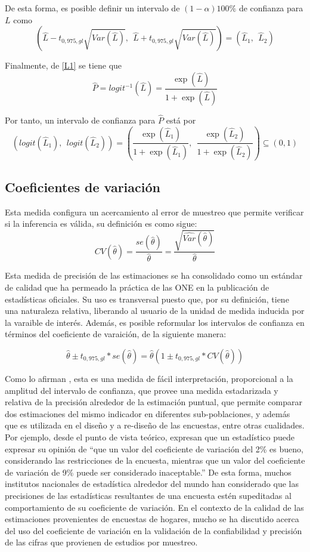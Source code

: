 \documentclass[12pt,spanish,]{book}
\begin{document}
De esta forma, es posible definir un intervalo de \((1-\alpha)100\%\) de confianza para \(L\) como
\[
\left(\hat{L} - t_{0,975, gl}\sqrt{Var(\hat{L})}, \ \
\hat{L} + t_{0,975, gl}\sqrt{Var(\hat{L})}
\right) =
(\hat{L}_1, \ \ \hat{L}_2)
\]

Finalmente, de \eqref{L1} se tiene que
\[
\hat{P} = logit^{-1}(\hat L) = \dfrac{\exp (\hat{L})}{1+\exp (\hat{L})}
\]

Por tanto, un intervalo de confianza para \(\hat{P}\) está por
\[
\left(logit(\hat{L}_1), \ \ logit(\hat{L}_2)\right) = 
\left(
\dfrac{\exp (\hat{L}_1)}{1+\exp (\hat{L}_1)}, \ \
\dfrac{\exp (\hat{L}_2)}{1+\exp (\hat{L}_2)}
\right) \subseteq (0, 1)
\]

\hypertarget{coeficientes-de-variacion}{%
\subsection{Coeficientes de variación}\label{coeficientes-de-variacion}}

Esta medida configura un acercamiento al error de muestreo que permite verificar si la inferencia es válida, su definición es como sigue:
\[
CV(\hat\theta) = \frac{se(\hat\theta)}{\hat\theta} = \frac{\sqrt{\widehat{Var}(\hat\theta)}}{\hat\theta}
\]

Esta medida de precisión de las estimaciones se ha consolidado como un estándar de calidad que ha permeado la práctica de las ONE en la publicación de estadísticas oficiales. Su uso es transversal puesto que, por su definición, tiene una naturaleza relativa, liberando al usuario de la unidad de medida inducida por la varaible de interés. Además, es posible reformular los intervalos de confianza en términos del coeficiente de varaición, de la siguiente manera:

\[
\hat\theta \pm t_{0,975, gl} * se(\hat\theta) = \hat\theta  \left(1 \pm t_{0,975, gl} * CV(\hat\theta)\right)
\]

Como lo afirman \textcite{Singh_Westlake_Feder_2004}, esta es una medida de fácil interpretación, proporcional a la amplitud del intervalo de confianza, que provee una medida estadarizada y relativa de la precisión alrededor de la estimación puntual, que permite comparar dos estimaciones del mismo indicador en diferentes sub-poblaciones, y además que es utilizada en el diseño y a re-diseño de las encuestas, entre otras cualidades. Por ejemplo, desde el punto de vista teórico, \textcite{Sarndal_Swensson_Wretman_2003} expresan que un estadístico puede expresar su opinión de ``que un valor del coeficiente de variación del 2\% es bueno, considerando las restricciones de la encuesta, mientras que un valor del coeficiente de variación de 9\% puede ser considerado inaceptable.'' De esta forma, muchos institutos nacionales de estadística alrededor del mundo han considerado que las precisiones de las estadísticas resultantes de una encuesta estén supeditadas al comportamiento de su coeficiente de variación. En el contexto de la calidad de las estimaciones provenientes de encuestas de hogares, mucho se ha discutido acerca del uso del coeficiente de variación en la validación de la confiabilidad y precisión de las cifras que provienen de estudios por muestreo.
\end{document}
